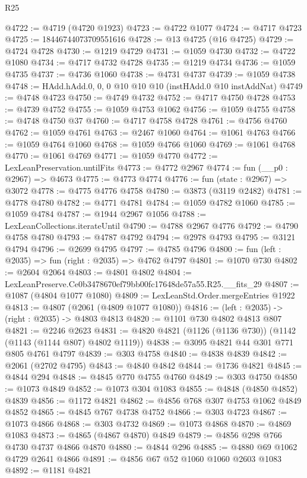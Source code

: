 \begin{lexlean}{R25}
\begin{coremodule}
@4722 := @4719 (@4720 @1923)
@4723 := @4722 @1077
@4724 := @4717 @4723
@4725 := 18446744073709551616
@4728 := @13 @4725 (@16 @4725)
@4729 := @4724 @4728
@4730 := @1219 @4729
@4731 := @1059 @4730
@4732 := @4722 @1080
@4734 := @4717 @4732 @4728
@4735 := @1219 @4734
@4736 := @1059 @4735
@4737 := @4736 @1060
@4738 := @4731 @4737
@4739 := @1059 @4738
@4748 := HAdd.hAdd.{0, 0, 0} @10 @10 @10 (instHAdd.{0} @10 instAddNat)
@4749 := @4748 @4723
@4750 := @4749 @4732
@4752 := @4717 @4750 @4728
@4753 := @4739 @4752
@4755 := @1059 @4753 @1062
@4756 := @1059 @4755
@4758 := @4748 @4750 @37
@4760 := @4717 @4758 @4728
@4761 := @4756 @4760
@4762 := @1059 @4761
@4763 := @2467 @1060
@4764 := @1061 @4763
@4766 := @1059 @4764 @1060
@4768 := @1059 @4766 @1060
@4769 := @1061 @4768
@4770 := @1061 @4769
@4771 := @1059 @4770
@4772 := LexLeanPreservation.untilFits
@4773 := @4772 @2967
@4774 := fun (__p0 : @2967) => @4673
@4775 := @4773 @4774
@4776 := fun (state : @2967) => @3072
@4778 := @4775 @4776 @4758
@4780 := @3873 (@3119 @2482)
@4781 := @4778 @4780
@4782 := @4771 @4781
@4784 := @1059 @4782 @1060
@4785 := @1059 @4784
@4787 := @1944 @2967 @1056
@4788 := LexLeanCollections.iterateUntil
@4790 := @4788 @2967 @4776
@4792 := @4790 @4758 @4780
@4793 := @4787 @4792
@4794 := @2978 @4793
@4795 := @3121 @4794
@4796 := @2699 @4795
@4797 := @4785 @4796
@4800 := fun (left : @2035) => fun (right : @2035) => @4762 @4797
@4801 := @1070 @730
@4802 := @2604 @2064
@4803 := @4801 @4802
@4804 := LexLeanPreserve.Ce0b3478670ef79bb00fc17648de57a55.R25.__fits_29
@4807 := @1087 (@4804 @1077 @1080)
@4809 := LexLeanStd.Order.mergeEntries @1922
@4813 := @4807 (@2061 (@4809 @1077 @1080))
@4816 := (left : @2035) -> (right : @2035) -> @4803 @4813
@4820 := @1101 @730 @4802 @4813 @807
@4821 := @2246 @2623
@4831 := @4820 @4821 (@1126 (@1136 @730)) (@1142 (@1143 (@1144 @807) @4802 @1119))
@4838 := @3095 @4821 @44 @301 @771 @805 @4761 @4797
@4839 := @303 @4758
@4840 := @4838 @4839
@4842 := @2061 (@2702 @4795)
@4843 := @4840 @4842
@4844 := @1736 @4821
@4845 := @4844 @294
@4848 := @4845 @770 @4755 @4760
@4849 := @303 @4750
@4850 := @1073 @4849
@4852 := @1073 @304 @1083
@4855 := @4848 (@4850 @4852) @4839
@4856 := @1172 @4821
@4862 := @4856 @768 @307 @4753 @1062 @4849 @4852
@4865 := @4845 @767 @4738 @4752
@4866 := @303 @4723
@4867 := @1073 @4866
@4868 := @303 @4732
@4869 := @1073 @4868
@4870 := @4869 @1083
@4873 := @4865 (@4867 @4870) @4849
@4879 := @4856 @298 @766 @4730 @4737 @4866 @4870
@4880 := @4844 @296
@4885 := @4880 @69 @1062 @4729 @2641 @4866
@4891 := @4856 @67 @52 @1060 @1060 @2603 @1083
@4892 := @1181 @4821

\end{coremodule}
\end{lexlean}
